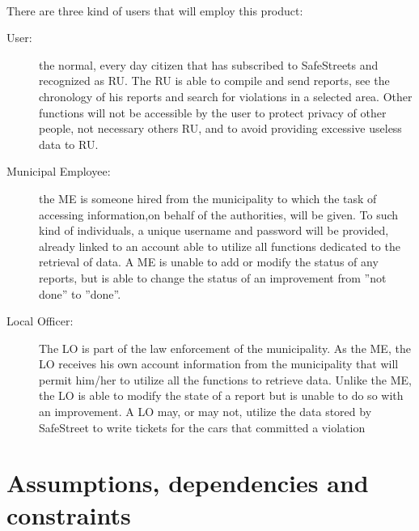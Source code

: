 			\paragraph{}
				There are three kind of users that will employ this product:
				\begin{description}
					\item[User:] the normal, every day citizen that has subscribed to SafeStreets and recognized as RU. The RU is able to compile and send reports, see the chronology of his reports and search for violations in a selected area. Other functions will not be accessible by the user to protect privacy of other people, not necessary others RU, and to avoid providing excessive useless data to RU.
					\item[Municipal Employee:] the ME is someone hired from the municipality to which the task of accessing information,on behalf of the authorities, will be given. To such kind of individuals, a unique username and password will be provided, already linked to an account able to utilize all functions dedicated to the retrieval of data. A ME is unable to add or modify the status of any reports, but is able to change the status of an improvement from ''not done'' to ''done''.
					\item[Local Officer:] The LO is part of the law enforcement of the municipality. As the ME, the LO receives his own account information from the municipality that will permit him/her to utilize all the functions to retrieve data. Unlike the ME, the LO is able to modify the state of a report but is unable to do so with an improvement. A LO may, or may not, utilize the data stored by SafeStreet to write tickets for the cars that committed a violation
				\end{description}
		\section{Assumptions, dependencies and constraints} \label{sez:Assumptions}
